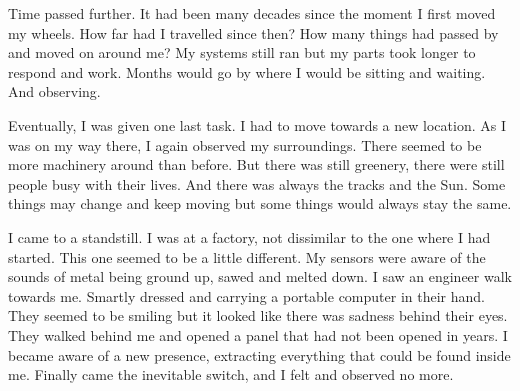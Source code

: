 Time passed further. It had been many decades since the moment I first moved my wheels. How far had I travelled since then? How many things had passed by and moved on around me? My systems still ran but my parts took longer to respond and work. Months would go by where I would be sitting and waiting. And observing.

Eventually, I was given one last task. I had to move towards a new location. As I was on my way there, I again observed my surroundings. There seemed to be more machinery around than before. But there was still greenery, there were still people busy with their lives. And there was always the tracks and the Sun. Some things may change and keep moving but some things would always stay the same.

I came to a standstill. I was at a factory, not dissimilar to the one where I had started. This one seemed to be a little different. My sensors were aware of the sounds of metal being ground up, sawed and melted down. I saw an engineer walk towards me. Smartly dressed and carrying a portable computer in their hand. They seemed to be smiling but it looked like there was sadness behind their eyes. They walked behind me and opened a panel that had not been opened in years. I became aware of a new presence, extracting everything that could be found inside me. Finally came the inevitable switch, and I felt and observed no more.
